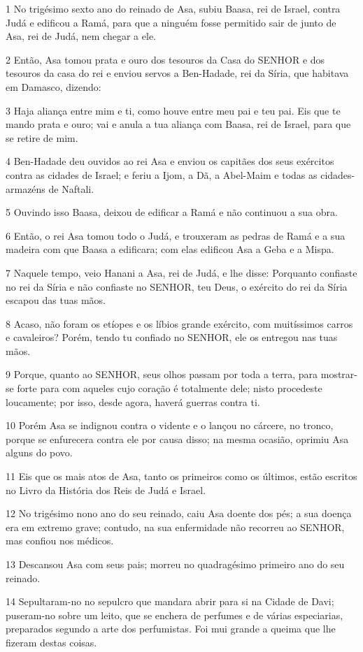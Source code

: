 \par 1 No trigésimo sexto ano do reinado de Asa, subiu Baasa, rei de Israel, contra Judá e edificou a Ramá, para que a ninguém fosse permitido sair de junto de Asa, rei de Judá, nem chegar a ele.
\par 2 Então, Asa tomou prata e ouro dos tesouros da Casa do SENHOR e dos tesouros da casa do rei e enviou servos a Ben-Hadade, rei da Síria, que habitava em Damasco, dizendo:
\par 3 Haja aliança entre mim e ti, como houve entre meu pai e teu pai. Eis que te mando prata e ouro; vai e anula a tua aliança com Baasa, rei de Israel, para que se retire de mim.
\par 4 Ben-Hadade deu ouvidos ao rei Asa e enviou os capitães dos seus exércitos contra as cidades de Israel; e feriu a Ijom, a Dã, a Abel-Maim e todas as cidades-armazéns de Naftali.
\par 5 Ouvindo isso Baasa, deixou de edificar a Ramá e não continuou a sua obra.
\par 6 Então, o rei Asa tomou todo o Judá, e trouxeram as pedras de Ramá e a sua madeira com que Baasa a edificara; com elas edificou Asa a Geba e a Mispa.
\par 7 Naquele tempo, veio Hanani a Asa, rei de Judá, e lhe disse: Porquanto confiaste no rei da Síria e não confiaste no SENHOR, teu Deus, o exército do rei da Síria escapou das tuas mãos.
\par 8 Acaso, não foram os etíopes e os líbios grande exército, com muitíssimos carros e cavaleiros? Porém, tendo tu confiado no SENHOR, ele os entregou nas tuas mãos.
\par 9 Porque, quanto ao SENHOR, seus olhos passam por toda a terra, para mostrar-se forte para com aqueles cujo coração é totalmente dele; nisto procedeste loucamente; por isso, desde agora, haverá guerras contra ti.
\par 10 Porém Asa se indignou contra o vidente e o lançou no cárcere, no tronco, porque se enfurecera contra ele por causa disso; na mesma ocasião, oprimiu Asa alguns do povo.
\par 11 Eis que os mais atos de Asa, tanto os primeiros como os últimos, estão escritos no Livro da História dos Reis de Judá e Israel.
\par 12 No trigésimo nono ano do seu reinado, caiu Asa doente dos pés; a sua doença era em extremo grave; contudo, na sua enfermidade não recorreu ao SENHOR, mas confiou nos médicos.
\par 13 Descansou Asa com seus pais; morreu no quadragésimo primeiro ano do seu reinado.
\par 14 Sepultaram-no no sepulcro que mandara abrir para si na Cidade de Davi; puseram-no sobre um leito, que se enchera de perfumes e de várias especiarias, preparados segundo a arte dos perfumistas. Foi mui grande a queima que lhe fizeram destas coisas.

